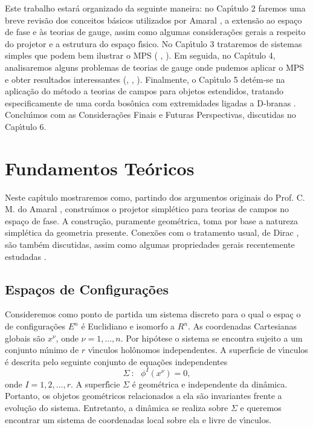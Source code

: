 \documentclass[a4paper,thmsa,12pt]{report}
\begin{document}
Este trabalho estar\'{a} organizado da seguinte maneira: no Cap\'{\i}tulo 2
faremos uma breve revis\~{a}o dos conceitos b\'{a}sicos utilizados por
Amaral \cite{cma}, a extens\~{a}o ao espa\c{c}o de fase e \`{a}s teorias de
gauge, assim como algumas considera\c{c}\~{o}es gerais a respeito do
projetor e a estrutura do espa\c{c}o f\'{\i}sico. No Cap\'{\i}tulo 3
trataremos de sistemas simples que podem bem ilustrar o MPS (\cite{c-lee} , 
\cite{revmmi}). Em seguida, no Cap\'{\i}tulo 4, analisaremos alguns problemas
de teorias de gauge onde pudemos aplicar o MPS e obter resultados
interessantes (\cite{qed}, \cite{helayel}, \cite{alvaro}). Finalmente, o
Cap\'{\i}tulo 5 det\'{e}m-se na aplica\c{c}\~{a}o do m\'{e}todo a teorias de
campos para objetos estendidos, tratando especificamente de uma corda
bos\^{o}nica com extremidades ligadas a D-branas \cite{mmi}. Conclu\'{\i}mos
com as Considera\c{c}\~{o}es Finais e Futuras Perspectivas, discutidas no
Cap\'{\i}tulo 6.

\chapter{{\sc Fundamentos Te\'oricos}}

Neste cap\'{\i}tulo mostraremos como, partindo dos argumentos originais do
Prof. C. M. do Amaral \cite{cma}, constru\'{\i}mos o projetor simpl\'{e}tico
para teorias de campos no espa\c{c}o de fase. A constru\c{c}\~{a}o,
puramente geom\'{e}trica, toma por base a natureza simpl\'{e}tica da
geometria presente. Conex\~{o}es com o tratamento usual, de Dirac \cite
{dirac}, s\~{a}o tamb\'{e}m discutidas, assim como algumas propriedades
gerais recentemente estudadas \cite{revmmi}.

\section{{\sc Espa\c cos de Configura\c c\~oes}}

Consideremos como ponto de partida um sistema discreto para o qual o espa\c{c%
}o de configura\c{c}\~{o}es $E^{n}$ \'{e} Euclidiano e isomorfo a $R^{n}$.
As coordenadas Cartesianas globais s\~{a}o $x^{\nu }$, onde $\nu =1,\ldots
,n $. Por hip\'{o}tese o sistema se encontra sujeito a um conjunto
m\'{\i}nimo de $r$ v\'{\i}nculos hol\^{o}nomos independentes. A
superf\'{\i}cie de v\'{\i}nculos \'{e} descrita pelo seguinte conjunto de
equa\c{c}\~{o}es independentes 
\begin{equation}
\Sigma ~:~~~\phi ^{I}(x^{\nu })=0,  \label{1}
\end{equation}
onde $I=1,2,\ldots ,r$. A superf\'{\i}cie $\Sigma $ \'{e} geom\'{e}trica e
independente da din\^{a}mica. Portanto, os objetos geom\'{e}tricos
relacionados a ela s\~{a}o invariantes frente a evolu\c{c}\~{a}o do sistema.
Entretanto, a din\^{a}mica se realiza sobre $\Sigma $ e queremos encontrar
um sistema de coordenadas local sobre ela e livre de v\'{\i}nculos.
\end{document}
